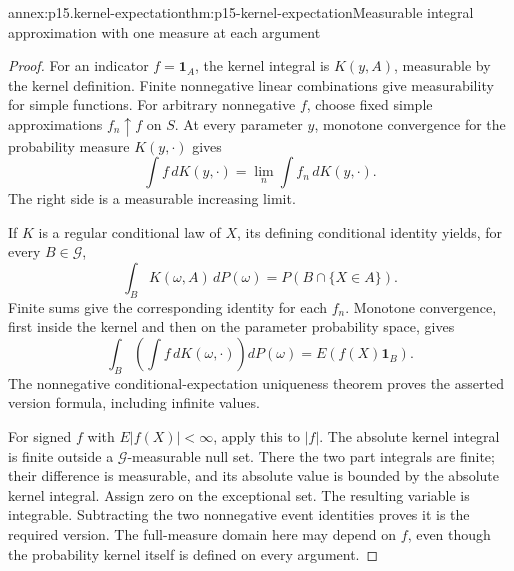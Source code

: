 
\begin{annexitem}{annex:p15.kernel-expectation}{thm:p15-kernel-expectation}{Measurable integral approximation with one measure at each argument}
\begin{proof}
For an indicator \(f=\mathbf1_A\), the kernel integral is \(K(y,A)\),
measurable by the kernel definition.
Finite nonnegative linear combinations give measurability for simple
functions. For arbitrary nonnegative \(f\), choose fixed simple
approximations \(f_n\uparrow f\) on \(S\).
At every parameter \(y\), monotone convergence for the probability
measure \(K(y,\cdot)\) gives
\[
                    \int f\,dK(y,\cdot)
                        =\lim_n\int f_n\,dK(y,\cdot).
\]
The right side is a measurable increasing limit.

If \(K\) is a regular conditional law of \(X\), its defining
conditional identity yields, for every \(B\in\mathcal G\),
\[
                 \int_B K(\omega,A)\,dP(\omega)
                         =P(B\cap\{X\in A\}).
\]
Finite sums give the corresponding identity for each \(f_n\).
Monotone convergence, first inside the kernel and then on the
parameter probability space, gives
\[
          \int_B\left(\int f\,dK(\omega,\cdot)\right)dP(\omega)
                              =E(f(X)\mathbf1_B).
\]
The nonnegative conditional-expectation uniqueness theorem proves
the asserted version formula, including infinite values.

For signed \(f\) with \(E|f(X)|<\infty\), apply this to \(|f|\).
The absolute kernel integral is finite outside a
\(\mathcal G\)-measurable null set.
There the two part integrals are finite; their difference is
measurable, and its absolute value is bounded by the absolute
kernel integral. Assign zero on the exceptional set.
The resulting variable is integrable. Subtracting the two
nonnegative event identities proves it is the required version.
The full-measure domain here may depend on \(f\), even though
the probability kernel itself is defined on every argument.
\end{proof}
\end{annexitem}

